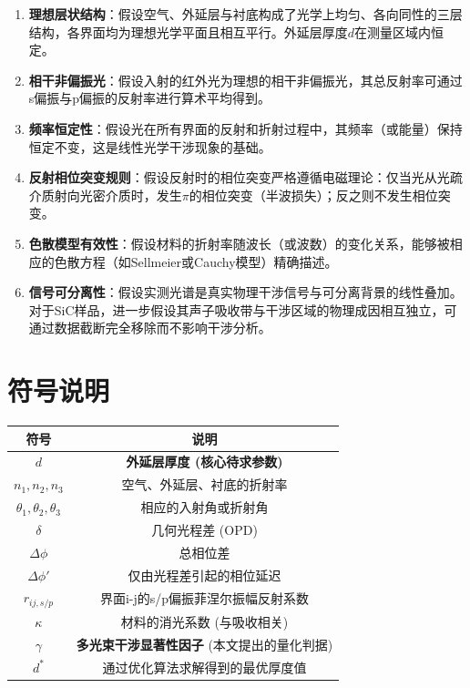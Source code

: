 \documentclass[withoutpreface,bwprint]{cumcmthesis} %
\begin{document}
\begin{enumerate}
    \item \textbf{理想层状结构}：假设空气、外延层与衬底构成了光学上均匀、各向同性的三层结构，各界面均为理想光学平面且相互平行。外延层厚度$d$在测量区域内恒定。

    \item \textbf{相干非偏振光}：假设入射的红外光为理想的相干非偏振光，其总反射率可通过s偏振与p偏振的反射率进行算术平均得到。

    \item \textbf{频率恒定性}：假设光在所有界面的反射和折射过程中，其频率（或能量）保持恒定不变，这是线性光学干涉现象的基础。

    \item \textbf{反射相位突变规则}：假设反射时的相位突变严格遵循电磁理论：仅当光从光疏介质射向光密介质时，发生$\pi$的相位突变（半波损失）；反之则不发生相位突变。

    \item \textbf{色散模型有效性}：假设材料的折射率随波长（或波数）的变化关系，能够被相应的色散方程（如Sellmeier或Cauchy模型）精确描述。

    \item \textbf{信号可分离性}：假设实测光谱是真实物理干涉信号与可分离背景的线性叠加。对于SiC样品，进一步假设其声子吸收带与干涉区域的物理成因相互独立，可通过数据截断完全移除而不影响干涉分析。
\end{enumerate}



\section{符号说明}

\renewcommand{\arraystretch}{1.2} %
\begin{table}[H]
    \centering
    \begin{tabular}{c c} %
        \hline
        \textbf{符号} & \textbf{说明} \\
        \hline
        $d$ & \textbf{外延层厚度 (核心待求参数)} \\
        $n_1, n_2, n_3$ & 空气、外延层、衬底的折射率 \\
        $\theta_1, \theta_2, \theta_3$ & 相应的入射角或折射角 \\
        $\delta$ & 几何光程差 (OPD) \\
        $\Delta\phi$ & 总相位差 \\
        $\Delta\phi'$ & 仅由光程差引起的相位延迟 \\
        $r_{ij,s/p}$ & 界面i-j的s/p偏振菲涅尔振幅反射系数 \\
        $\kappa$ & 材料的消光系数 (与吸收相关) \\
        $\gamma$ & \textbf{多光束干涉显著性因子} (本文提出的量化判据) \\
        $d^*$ & 通过优化算法求解得到的最优厚度值 \\
        \hline
    \end{tabular}
\end{table}
\renewcommand{\arraystretch}{1} %
\end{document}
